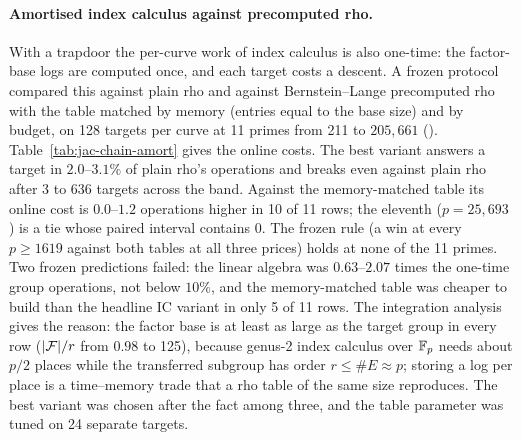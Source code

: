 \paragraph{Amortised index calculus against precomputed rho.} With a
trapdoor the per-curve work of index calculus is also one-time: the
factor-base logs are computed once, and each target costs a descent. A
frozen protocol compared this against plain rho and against
Bernstein--Lange precomputed rho with the table matched by memory (entries
equal to the base size) and by budget, on 128 targets per curve at 11
primes from 211 to $205{,}661$
().
Table~\ref{tab:jac-chain-amort} gives the online costs. The best variant
answers a target in $2.0$--$3.1\%$ of plain rho's operations and breaks even
against plain rho after 3 to 636 targets across the band. Against the
memory-matched table its online cost is $0.0$--$1.2$ operations higher in 10
of 11 rows; the eleventh ($p=25{,}693$) is a tie whose paired interval
contains 0. The frozen rule (a win at every $p\ge1619$ against both tables at
all three prices) holds at none of the 11 primes. Two frozen predictions
failed: the linear algebra was $0.63$--$2.07$ times the one-time group
operations, not below $10\%$, and the memory-matched table was cheaper to
build than the headline IC variant in only 5 of 11 rows. The integration
analysis gives the reason: the factor base is at least as large as the
target group in every row ($\lvert \mathcal{F} \rvert/r$ from $0.98$ to 125), because genus-2
index calculus over $\mathbb{F}_p$ needs about $p/2$ places while the transferred
subgroup has order $r\le\#E\approx p$; storing a log per place is a
time--memory trade that a rho table of the same size reproduces. The best
variant was chosen after the fact among three, and the table parameter was
tuned on 24 separate targets.

